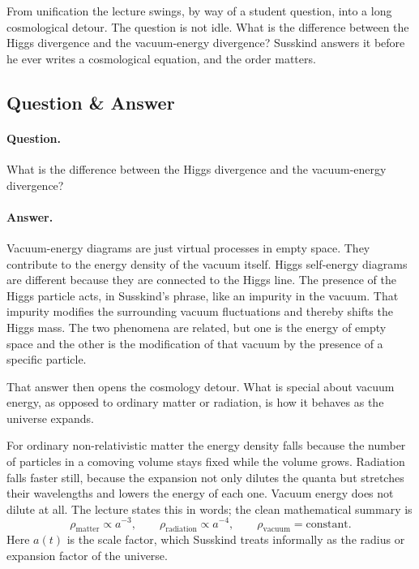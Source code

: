 From unification the lecture swings, by way of a student question, into a long cosmological detour. The question is not idle. What is the difference between the Higgs divergence and the vacuum-energy divergence? Susskind answers it before he ever writes a cosmological equation, and the order matters.

\subsection{Question \& Answer}

\paragraph{Question.} What is the difference between the Higgs divergence and the vacuum-energy divergence?

\paragraph{Answer.} Vacuum-energy diagrams are just virtual processes in empty space. They contribute to the energy density of the vacuum itself. Higgs self-energy diagrams are different because they are connected to the Higgs line. The presence of the Higgs particle acts, in Susskind's phrase, like an impurity in the vacuum. That impurity modifies the surrounding vacuum fluctuations and thereby shifts the Higgs mass. The two phenomena are related, but one is the energy of empty space and the other is the modification of that vacuum by the presence of a specific particle.

That answer then opens the cosmology detour. What is special about vacuum energy, as opposed to ordinary matter or radiation, is how it behaves as the universe expands.

For ordinary non-relativistic matter the energy density falls because the number of particles in a comoving volume stays fixed while the volume grows. Radiation falls faster still, because the expansion not only dilutes the quanta but stretches their wavelengths and lowers the energy of each one. Vacuum energy does not dilute at all. The lecture states this in words; the clean mathematical summary is
\begin{equation}
\rho_{\mathrm{matter}}\propto a^{-3},
\qquad
\rho_{\mathrm{radiation}}\propto a^{-4},
\qquad
\rho_{\mathrm{vacuum}}=\text{constant}.
\end{equation}
Here \(a(t)\) is the scale factor, which Susskind treats informally as the radius or expansion factor of the universe.

